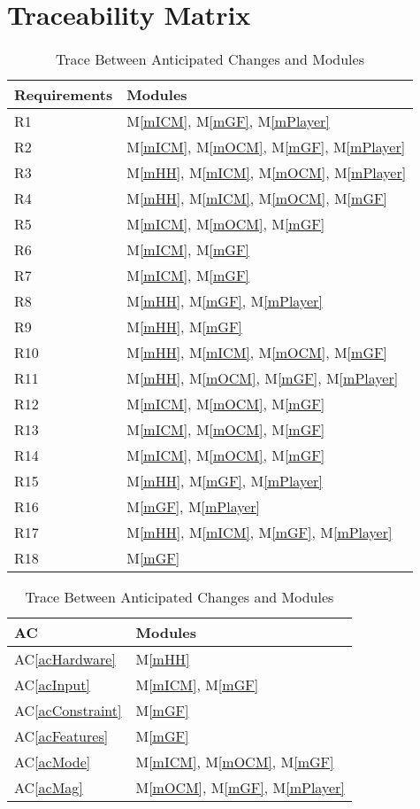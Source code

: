 \documentclass[12pt,letterpaper]{article}
\newcommand{\acref}[1]{AC\ref{#1}}
\newcommand{\mref}[1]{M\ref{#1}}
\begin{document}
	\section{Traceability Matrix} \label{SecTM}
\begin{table}[h!]
\centering
\begin{tabular}{p{} p{}}
\toprule
\textbf{Requirements} & \textbf{Modules}\\
\midrule
{R1} & \mref{mICM}, \mref{mGF}, \mref{mPlayer}\\
{R2} & \mref{mICM}, \mref{mOCM}, \mref{mGF}, \mref{mPlayer}\\
{R3} & \mref{mHH}, \mref{mICM}, \mref{mOCM}, \mref{mPlayer}\\
{R4} & \mref{mHH}, \mref{mICM}, \mref{mOCM}, \mref{mGF} \\
{R5} & \mref{mICM}, \mref{mOCM}, \mref{mGF} \\
{R6} & \mref{mICM}, \mref{mGF} \\
{R7} & \mref{mICM}, \mref{mGF} \\
{R8} & \mref{mHH}, \mref{mGF}, \mref{mPlayer}\\
{R9} & \mref{mHH}, \mref{mGF}\\
{R10} & \mref{mHH}, \mref{mICM}, \mref{mOCM}, \mref{mGF}\\
{R11} & \mref{mHH}, \mref{mOCM}, \mref{mGF}, \mref{mPlayer}\\
{R12} & \mref{mICM}, \mref{mOCM}, \mref{mGF}\\
{R13} & \mref{mICM}, \mref{mOCM}, \mref{mGF}\\
{R14} & \mref{mICM}, \mref{mOCM}, \mref{mGF}\\
{R15} & \mref{mHH}, \mref{mGF}, \mref{mPlayer}\\
{R16} & \mref{mGF}, \mref{mPlayer}\\
{R17} & \mref{mHH}, \mref{mICM}, \mref{mGF}, \mref{mPlayer}\\
{R18} & \mref{mGF}\\
\bottomrule
\end{tabular}
\caption{Trace Between Requirements and Modules}
\label{TblRT}
\centering
\begin{tabular}{p{} p{}}
\toprule
\textbf{AC} & \textbf{Modules}\\
\midrule
\acref{acHardware} & \mref{mHH} \\
\acref{acInput} & \mref{mICM}, \mref{mGF} \\
\acref{acConstraint} & \mref{mGF}\\
\acref{acFeatures} & \mref{mGF}\\
\acref{acMode} & \mref{mICM}, \mref{mOCM}, \mref{mGF} \\
\acref{acMag} & \mref{mOCM}, \mref{mGF}, \mref{mPlayer} \\
\bottomrule
\end{tabular}
\caption{Trace Between Anticipated Changes and Modules}
\label{TblACT}
\end{table}
\clearpage
\end{document}
